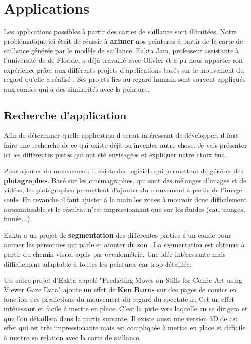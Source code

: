 \chapter{Applications}

\par
Les applications possibles à partir des cartes de saillance sont illimitées. Notre problématique ici était de réussir à \textbf{animer} nos peintures à partir de la carte de saillance générée par le modèle de saillance. Eakta Jain, professeur assistante à l'université de de Floride, a déjà travaillé avec Olivier et a pu nous apporter son expérience grâce aux différents projets d'applications basés sur le mouvement du regard qu'elle a réalisé \cite{eaktalab}. Ses projets liés au regard humain sont souvent appliqués aux comics qui a des similarités avec la peinture.

\section{Recherche d'application}

\par
Afin de déterminer quelle application il serait intéressant de développer, il faut faire une recherche de ce qui existe déjà ou inventer autre chose. Je vais présenter ici les différentes pistes qui ont été envisagées et expliquer notre choix final.

\par
Pour ajouter du mouvement, il existe des logiciels qui permettent de générer des \textbf{plotagraphes}. Basé sur les cinémagraphes, qui sont des mélanges d'images et de vidéos, les plotagraphes permettent d'ajouter du mouvement à partir de l'image seule. En revanche il faut ajuster à la main les zones à mouvoir donc difficilement automatisable et le résultat n'est impressionnant que sur les fluides (eau, nuages, fumée...).

\par
Eakta a un projet de \textbf{segmentation} des différentes parties d'un comic pour animer les personnes qui parle et ajouter du son \cite{segmentationcomics}. La segmentation est obtenue à partir du chemin visuel aquis par occulométrie. Une idée intéressante mais difficilement adaptable à toutes les peintures car trop détaillée.

\par
Un autre projet d'Eakta appelé "Predicting Moves-on-Stills for Comic Art using Viewer Gaze Data" \cite{kenburns} ajoute un effet de \textbf{Ken Burns} sur des pages de comics en fonction des prédictions du mouvement du regard du spectateur. Cet un effet intéressant et facile à mettre en place. C'est la piste vers laquelle on se dirigera et que l'on détaillera dans la partie suivante. Il existe aussi une version 3D de cet effet \cite{kenburns3D} qui est très impressionante mais est compliquée à mettre en place et difficile à mettre en relation avec la carte de saillance.

